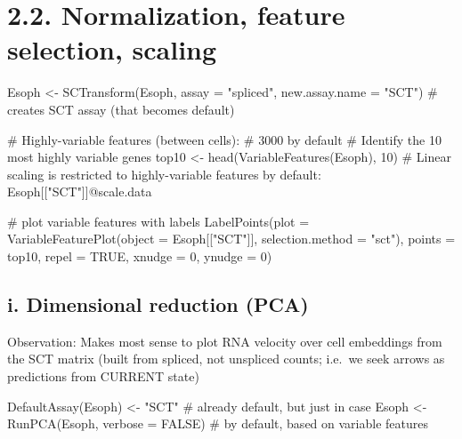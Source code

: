 \documentclass[
  letterpaper,
  DIV=11,
  numbers=noendperiod]{scrreprt}
\newenvironment{Shaded}{\begin{snugshade}}{\end{snugshade}}
\newcommand{\AttributeTok}[1]{\textcolor[rgb]{0.40,0.45,0.13}{#1}}
\newcommand{\CommentTok}[1]{\textcolor[rgb]{0.37,0.37,0.37}{#1}}
\newcommand{\ConstantTok}[1]{\textcolor[rgb]{0.56,0.35,0.01}{#1}}
\newcommand{\DecValTok}[1]{\textcolor[rgb]{0.68,0.00,0.00}{#1}}
\newcommand{\FunctionTok}[1]{\textcolor[rgb]{0.28,0.35,0.67}{#1}}
\newcommand{\NormalTok}[1]{\textcolor[rgb]{0.00,0.23,0.31}{#1}}
\newcommand{\OtherTok}[1]{\textcolor[rgb]{0.00,0.23,0.31}{#1}}
\newcommand{\StringTok}[1]{\textcolor[rgb]{0.13,0.47,0.30}{#1}}
\begin{document}
\section{2.2. Normalization, feature selection,
scaling}\label{normalization-feature-selection-scaling}

\begin{Shaded}
\begin{Highlighting}[]
\NormalTok{Esoph }\OtherTok{\textless{}{-}} \FunctionTok{SCTransform}\NormalTok{(Esoph, }\AttributeTok{assay =} \StringTok{"spliced"}\NormalTok{, }\AttributeTok{new.assay.name =} \StringTok{"SCT"}\NormalTok{)}
\CommentTok{\# creates SCT assay (that becomes default)}

\CommentTok{\# Highly{-}variable features (between cells):  \# 3000 by default}
\CommentTok{\# Identify the 10 most highly variable genes}
\NormalTok{top10 }\OtherTok{\textless{}{-}} \FunctionTok{head}\NormalTok{(}\FunctionTok{VariableFeatures}\NormalTok{(Esoph), }\DecValTok{10}\NormalTok{)}
\CommentTok{\# Linear scaling is restricted to highly{-}variable features by default: Esoph[["SCT"]]@scale.data}
\end{Highlighting}
\end{Shaded}

\begin{Shaded}
\begin{Highlighting}[]
\CommentTok{\# plot variable features with labels}
\FunctionTok{LabelPoints}\NormalTok{(}\AttributeTok{plot =} \FunctionTok{VariableFeaturePlot}\NormalTok{(}\AttributeTok{object =}\NormalTok{ Esoph[[}\StringTok{"SCT"}\NormalTok{]], }\AttributeTok{selection.method =} \StringTok{"sct"}\NormalTok{), }\AttributeTok{points =}\NormalTok{ top10, }\AttributeTok{repel =} \ConstantTok{TRUE}\NormalTok{, }\AttributeTok{xnudge =} \DecValTok{0}\NormalTok{, }\AttributeTok{ynudge =} \DecValTok{0}\NormalTok{)}
\end{Highlighting}
\end{Shaded}

\subsection{i. Dimensional reduction
(PCA)}\label{i.-dimensional-reduction-pca}

Observation: Makes most sense to plot RNA velocity over cell embeddings
from the SCT matrix (built from spliced, not unspliced counts; i.e.~we
seek arrows as predictions from CURRENT state)

\begin{Shaded}
\begin{Highlighting}[]
\FunctionTok{DefaultAssay}\NormalTok{(Esoph) }\OtherTok{\textless{}{-}} \StringTok{"SCT"} \CommentTok{\# already default, but just in case}
\NormalTok{Esoph }\OtherTok{\textless{}{-}} \FunctionTok{RunPCA}\NormalTok{(Esoph, }\AttributeTok{verbose =} \ConstantTok{FALSE}\NormalTok{) }\CommentTok{\# by default, based on variable features}
\end{Highlighting}
\end{Shaded}
\end{document}
